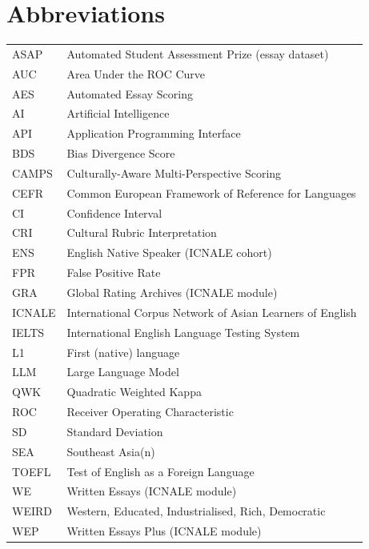 \tableofcontents
\newpage
\listoffigures
\newpage
\listoftables

\newpage
\section*{Abbreviations}
\begin{tabular}{ll}
ASAP & Automated Student Assessment Prize (essay dataset) \\
AUC & Area Under the ROC Curve \\
AES & Automated Essay Scoring \\
AI & Artificial Intelligence \\
API & Application Programming Interface \\
BDS & Bias Divergence Score \\
CAMPS & Culturally-Aware Multi-Perspective Scoring \\
CEFR & Common European Framework of Reference for Languages \\
CI & Confidence Interval \\
CRI & Cultural Rubric Interpretation \\
ENS & English Native Speaker (ICNALE cohort) \\
FPR & False Positive Rate \\
GRA & Global Rating Archives (ICNALE module) \\
ICNALE & International Corpus Network of Asian Learners of English \\
IELTS & International English Language Testing System \\
L1 & First (native) language \\
LLM & Large Language Model \\
QWK & Quadratic Weighted Kappa \\
ROC & Receiver Operating Characteristic \\
SD & Standard Deviation \\
SEA & Southeast Asia(n) \\
TOEFL & Test of English as a Foreign Language \\
WE & Written Essays (ICNALE module) \\
WEIRD & Western, Educated, Industrialised, Rich, Democratic \\
WEP & Written Essays Plus (ICNALE module) \\
\end{tabular}
